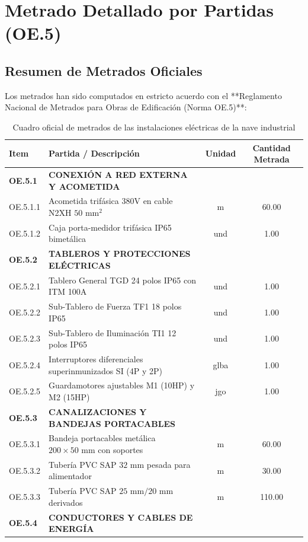 \chapter{Metrado Detallado por Partidas (OE.5)}

\section{Resumen de Metrados Oficiales}
Los metrados han sido computados en estricto acuerdo con el **Reglamento Nacional de Metrados para Obras de Edificación (Norma OE.5)**:

\begin{table}[H]
\centering
\caption{Cuadro oficial de metrados de las instalaciones eléctricas de la nave industrial}
\begin{tabular}{llcc}
\toprule
\textbf{Item} & \textbf{Partida / Descripción} & \textbf{Unidad} & \textbf{Cantidad Metrada} \\
\midrule
\textbf{OE.5.1} & \textbf{CONEXIÓN A RED EXTERNA Y ACOMETIDA} & & \\
OE.5.1.1 & Acometida trifásica 380V en cable N2XH $50\text{ mm}^2$ & m & 60.00 \\
OE.5.1.2 & Caja porta-medidor trifásica IP65 bimetálica & und & 1.00 \\
\midrule
\textbf{OE.5.2} & \textbf{TABLEROS Y PROTECCIONES ELÉCTRICAS} & & \\
OE.5.2.1 & Tablero General TGD 24 polos IP65 con ITM 100A & und & 1.00 \\
OE.5.2.2 & Sub-Tablero de Fuerza TF1 18 polos IP65 & und & 1.00 \\
OE.5.2.3 & Sub-Tablero de Iluminación TI1 12 polos IP65 & und & 1.00 \\
OE.5.2.4 & Interruptores diferenciales superinmunizados SI (4P y 2P) & glba & 1.00 \\
OE.5.2.5 & Guardamotores ajustables M1 (10HP) y M2 (15HP) & jgo & 1.00 \\
\midrule
\textbf{OE.5.3} & \textbf{CANALIZACIONES Y BANDEJAS PORTACABLES} & & \\
OE.5.3.1 & Bandeja portacables metálica $200 \times 50\text{ mm}$ con soportes & m & 60.00 \\
OE.5.3.2 & Tubería PVC SAP $32\text{ mm}$ pesada para alimentador & m & 30.00 \\
OE.5.3.3 & Tubería PVC SAP $25\text{ mm} / 20\text{ mm}$ derivados & m & 110.00 \\
\midrule
\textbf{OE.5.4} & \textbf{CONDUCTORES Y CABLES DE ENERGÍA} & & \\

\end{tabular}
\end{table}
